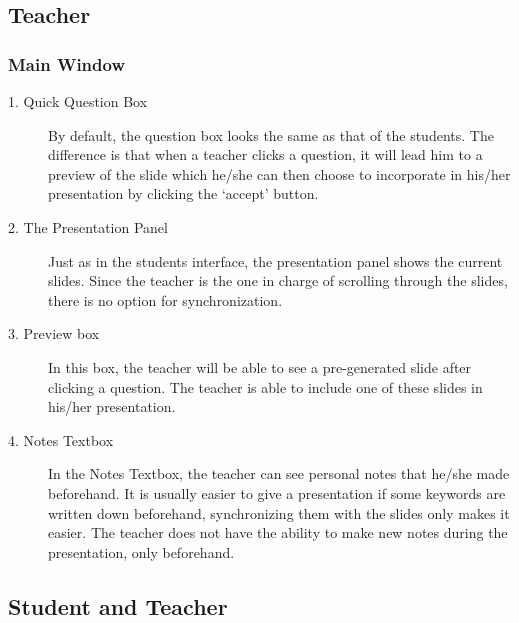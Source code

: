 \documentclass[11pt]{article}
\begin{document}
\subsection{Teacher}
\label{teacherInterface}
\subsubsection{Main Window}
\begin{description}
\item[1. Quick Question Box] By default, the question box looks the same as that of the students. The difference is that when a teacher clicks a question, it will lead him to a preview of the slide which he/she can then choose to incorporate in his/her presentation by clicking the `accept' button. 

\item[2. The Presentation Panel] Just as in the students interface, the presentation panel shows the current slides. Since the teacher is the one in charge of scrolling through the slides, there is no option for synchronization. 

\item[3. Preview box] In this box, the teacher will be able to see a pre-generated slide after clicking a question. The teacher is able to include one of these slides in his/her presentation. 

\item[4. Notes Textbox] In the Notes Textbox, the teacher can see personal notes that he/she made beforehand. It is usually easier to give a presentation if some keywords are written down beforehand, synchronizing them with the slides only makes it easier. The teacher does not have the ability to make new notes during the presentation, only beforehand.
\end{description}
\subsection{Student and Teacher}
\end{document}
